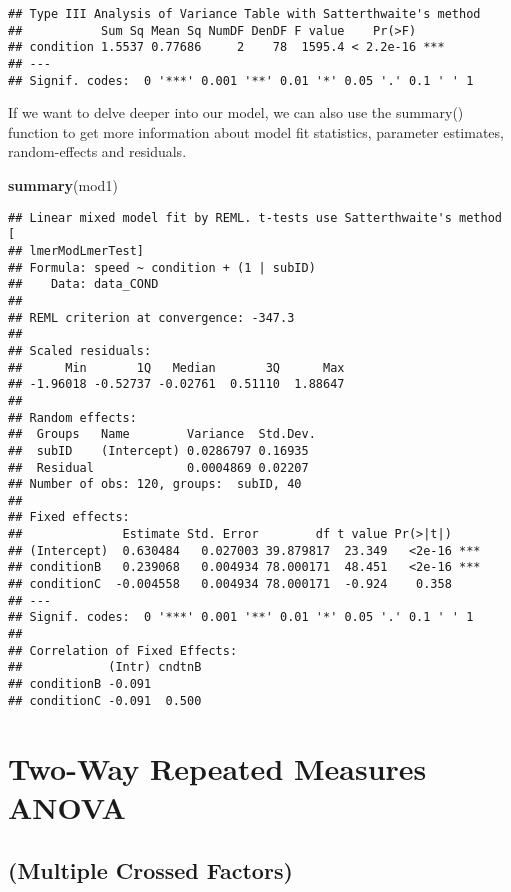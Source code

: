 \documentclass[]{article}
\newenvironment{Shaded}{\begin{snugshade}}{\end{snugshade}}
\newcommand{\KeywordTok}[1]{\textcolor[rgb]{0.13,0.29,0.53}{\textbf{#1}}}
\newcommand{\NormalTok}[1]{#1}
\begin{document}
\begin{verbatim}
## Type III Analysis of Variance Table with Satterthwaite's method
##           Sum Sq Mean Sq NumDF DenDF F value    Pr(>F)    
## condition 1.5537 0.77686     2    78  1595.4 < 2.2e-16 ***
## ---
## Signif. codes:  0 '***' 0.001 '**' 0.01 '*' 0.05 '.' 0.1 ' ' 1
\end{verbatim}

If we want to delve deeper into our model, we can also use the summary()
function to get more information about model fit statistics, parameter
estimates, random-effects and residuals.

\begin{Shaded}
\begin{Highlighting}[]
\KeywordTok{summary}\NormalTok{(mod1)}
\end{Highlighting}
\end{Shaded}

\begin{verbatim}
## Linear mixed model fit by REML. t-tests use Satterthwaite's method [
## lmerModLmerTest]
## Formula: speed ~ condition + (1 | subID)
##    Data: data_COND
## 
## REML criterion at convergence: -347.3
## 
## Scaled residuals: 
##      Min       1Q   Median       3Q      Max 
## -1.96018 -0.52737 -0.02761  0.51110  1.88647 
## 
## Random effects:
##  Groups   Name        Variance  Std.Dev.
##  subID    (Intercept) 0.0286797 0.16935 
##  Residual             0.0004869 0.02207 
## Number of obs: 120, groups:  subID, 40
## 
## Fixed effects:
##              Estimate Std. Error        df t value Pr(>|t|)    
## (Intercept)  0.630484   0.027003 39.879817  23.349   <2e-16 ***
## conditionB   0.239068   0.004934 78.000171  48.451   <2e-16 ***
## conditionC  -0.004558   0.004934 78.000171  -0.924    0.358    
## ---
## Signif. codes:  0 '***' 0.001 '**' 0.01 '*' 0.05 '.' 0.1 ' ' 1
## 
## Correlation of Fixed Effects:
##            (Intr) cndtnB
## conditionB -0.091       
## conditionC -0.091  0.500
\end{verbatim}

\hypertarget{two-way-repeated-measures-anova}{%
\section{Two-Way Repeated Measures
ANOVA}\label{two-way-repeated-measures-anova}}

\hypertarget{multiple-crossed-factors}{%
\subsection{(Multiple Crossed Factors)}\label{multiple-crossed-factors}}
\end{document}
